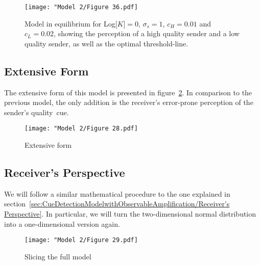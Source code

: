 \documentclass[a4paper,12pt]{article}
\numberwithin{equation}{section}
\begin{document}
\begin{figure}[h]
\captionsetup{width=350pt}
\begin{center}
\leavevmode
\texttt{[image: "Model 2/Figure 36.pdf]}
\caption{Model in equilibrium for Log[$K$]$=0$, $\sigma_{s}=1$, $c_{H}=0.01$ and $c_{L}=0.02$, showing the perception of a high quality sender and a low quality sender, as well as the optimal threshold-line.}
\label{fig:Model 2/Figure 36.pdf}
\end{center}
\end{figure}


\subsection{Extensive Form}
\label{sec:CueandSignalDetectionModel/Extensive Form}

The extensive form of this model is presented in figure~\ref{fig:Model 2/Figure 28.pdf}. In comparison to the previous model, the only addition is the receiver's error-prone perception of the sender's quality~cue.
\begin{figure}[!h]
\begin{center}
\leavevmode
\texttt{[image: "Model 2/Figure 28.pdf]}
\caption{Extensive form}
\label{fig:Model 2/Figure 28.pdf}
\end{center}
\end{figure}


\subsection{Receiver's Perspective}
\label{sec:CueandSignalDetectionModel/Receiver's Perspective}

We will follow a similar mathematical procedure to the one explained in section~\ref{sec:CueDetectionModelwithObservableAmplification/Receiver's Perspective}. In particular, we will turn the two-dimensional normal distribution into a one-dimensional version again.
\begin{figure}[!h]
\begin{center}
\leavevmode
\texttt{[image: "Model 2/Figure 29.pdf]}
\caption{Slicing the full model}
\label{fig:Model 2/Figure 29.pdf}
\end{center}
\end{figure}
\end{document}
